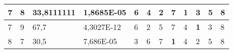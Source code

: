 \documentclass[conference]{IEEEtran}
\begin{document}
\begin{table*}[]
\begin{tabular}{|llll|llllllll|}
\multicolumn{1}{|l|}{7}                                                     & \multicolumn{1}{l|}{8}                                                        & \multicolumn{1}{l|}{33,8111111}                                                   & 1,8685E-05                     & \multicolumn{1}{l|}{6}                                                  & \multicolumn{1}{l|}{4}                                                  & \multicolumn{1}{l|}{2}                                                  & \multicolumn{1}{l|}{7}                                                  & \multicolumn{1}{l|}{\textbf{1}}                                         & \multicolumn{1}{l|}{3}                                                  & \multicolumn{1}{l|}{5}                                                  & 8                          \\ \hline
\multicolumn{1}{|l|}{7}                                                     & \multicolumn{1}{l|}{9}                                                        & \multicolumn{1}{l|}{67,7}                                                         & 4,3027E-12                     & \multicolumn{1}{l|}{6}                                                  & \multicolumn{1}{l|}{2}                                                  & \multicolumn{1}{l|}{5}                                                  & \multicolumn{1}{l|}{7}                                                  & \multicolumn{1}{l|}{4}                                                  & \multicolumn{1}{l|}{\textbf{1}}                                         & \multicolumn{1}{l|}{3}                                                  & 8                          \\ \hline
\multicolumn{1}{|l|}{8}                                                     & \multicolumn{1}{l|}{7}                                                        & \multicolumn{1}{l|}{30,5}                                                         & 7,686E-05                      & \multicolumn{1}{l|}{3}                                                  & \multicolumn{1}{l|}{6}                                                  & \multicolumn{1}{l|}{7}                                                  & \multicolumn{1}{l|}{\textbf{1}}                                         & \multicolumn{1}{l|}{4}                                                  & \multicolumn{1}{l|}{2}                                                  & \multicolumn{1}{l|}{5}                                                  & 8                          \\ \hline

\end{tabular}
\end{table*}
\end{document}
